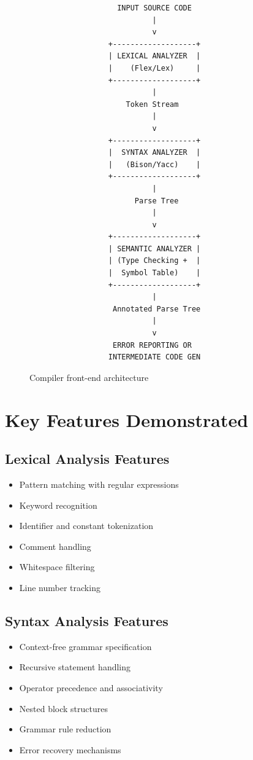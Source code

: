 \documentclass[12pt,a4paper]{article}
\begin{document}
\begin{figure}[H]
\centering
\begin{verbatim}
                    INPUT SOURCE CODE
                            |
                            v
                  +-------------------+
                  | LEXICAL ANALYZER  |
                  |    (Flex/Lex)     |
                  +-------------------+
                            |
                      Token Stream
                            |
                            v
                  +-------------------+
                  |  SYNTAX ANALYZER  |
                  |   (Bison/Yacc)    |
                  +-------------------+
                            |
                        Parse Tree
                            |
                            v
                  +-------------------+
                  | SEMANTIC ANALYZER |
                  | (Type Checking +  |
                  |  Symbol Table)    |
                  +-------------------+
                            |
                   Annotated Parse Tree
                            |
                            v
                   ERROR REPORTING OR
                  INTERMEDIATE CODE GEN
\end{verbatim}
\caption{Compiler front-end architecture}
\end{figure}

\section{Key Features Demonstrated}

\subsection{Lexical Analysis Features}
\begin{itemize}
    \item Pattern matching with regular expressions
    \item Keyword recognition
    \item Identifier and constant tokenization
    \item Comment handling
    \item Whitespace filtering
    \item Line number tracking
\end{itemize}

\subsection{Syntax Analysis Features}
\begin{itemize}
    \item Context-free grammar specification
    \item Recursive statement handling
    \item Operator precedence and associativity
    \item Nested block structures
    \item Grammar rule reduction
    \item Error recovery mechanisms
\end{itemize}
\end{document}
